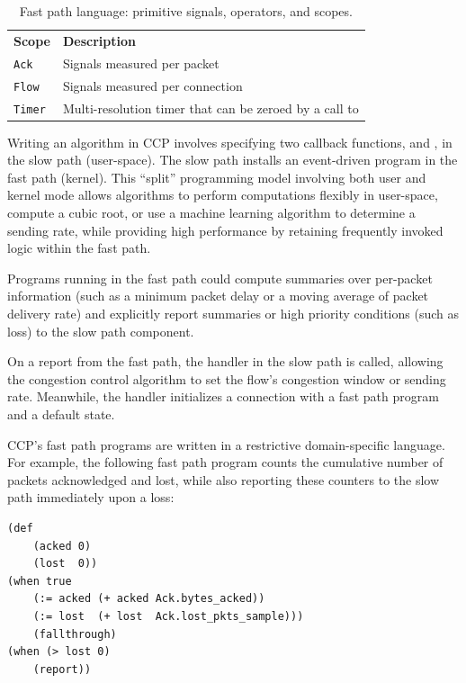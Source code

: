 \begin{table}
\begin{tabular}{p{}p{}}
        \hline
        \textbf{Scope} & \textbf{Description} \\
        \texttt{Ack} & Signals measured per packet \\
        \texttt{Flow} & Signals measured per connection \\
        \texttt{Timer} & Multi-resolution timer that can be zeroed by a call to \ct{reset} \\
    \end{tabular}
    \caption{Fast path language: primitive signals, operators, and scopes.}\label{tab:api}
\end{table}

Writing an algorithm in CCP involves specifying two callback functions,
 and , in the slow path (user-space). The slow path installs an
event-driven program in the fast path (kernel).
This ``split'' programming model involving both user and kernel mode allows
algorithms to perform computations flexibly in user-space, \eg compute a cubic
root, or use a machine learning algorithm to determine a sending rate, while
providing high performance by retaining frequently invoked logic within
the fast path.

Programs running in the fast path could compute summaries over per-packet
information (such as a minimum packet delay or a moving average of packet
delivery rate) and explicitly report summaries or high priority conditions
(such as loss) to the slow path component.

On a report from the fast path, the  handler in the slow path is
called, allowing the congestion control algorithm to set the flow's congestion
window or sending rate.
%
Meanwhile, the  handler initializes a connection with a
fast path program and a default state.

 CCP's fast path programs are written in a restrictive
domain-specific language.
%
For example, the following fast path program counts the cumulative
number of packets acknowledged and lost, while also reporting these counters to
the slow path immediately upon a loss:

{\footnotesize
\begin{verbatim}
(def
    (acked 0)
    (lost  0))
(when true
    (:= acked (+ acked Ack.bytes_acked))
    (:= lost  (+ lost  Ack.lost_pkts_sample)))
    (fallthrough)
(when (> lost 0)
    (report))
\end{verbatim}
}

